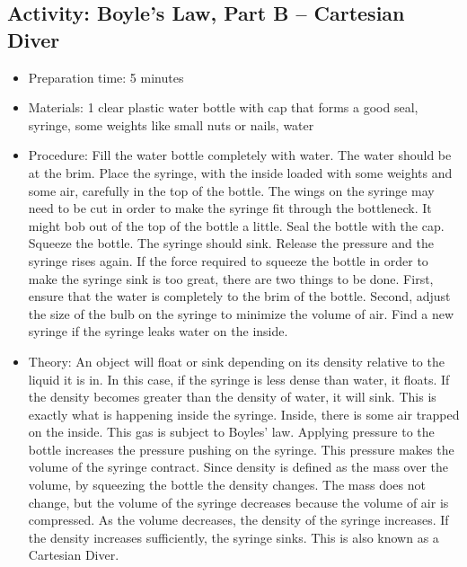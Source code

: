 \begin{itemize}
{\begin{itemize}
\subsection{Activity: Boyle’s Law, Part B – Cartesian Diver}
\begin{itemize}
\item{Preparation time: 5 minutes}
\item{Materials: 1 clear plastic water bottle with cap that forms a good seal, syringe, some weights like small nuts or nails, water}
\item{Procedure: Fill the water bottle completely with water. The water should be at the brim. Place the syringe, with the inside loaded with some weights and some air, carefully in the top of the bottle. The wings on the syringe may need to be cut in order to make the syringe fit through the bottleneck. It might bob out of the top of the bottle a little. Seal the bottle with the cap. Squeeze the bottle. The syringe should sink. Release the pressure and the syringe rises again. If the force required to squeeze the bottle in order to make the syringe sink is too great, there are two things to be done. First, ensure that the water is completely to the brim of the bottle. Second, adjust the size of the bulb on the syringe to minimize the volume of air. Find a new syringe if the syringe leaks water on the inside.}
\item{Theory: An object will float or sink depending on its density relative to the liquid it is in. In this case, if the syringe is less dense than water, it floats. If the density becomes greater than the density of water, it will sink. This is exactly what is happening inside the syringe. Inside, there is some air trapped on the inside. This gas is subject to Boyles’ law. Applying pressure to the bottle increases the pressure pushing on the syringe. This pressure makes the volume of the syringe contract. Since density is defined as the mass over the volume, by squeezing the bottle the density changes. The mass does not change, but the volume of the syringe decreases because the volume of air is compressed. As the volume decreases, the density of the syringe increases. If the density increases sufficiently, the syringe sinks. This is also known as a Cartesian Diver.

}
\end{itemize}
\end{itemize}}
\end{itemize}

